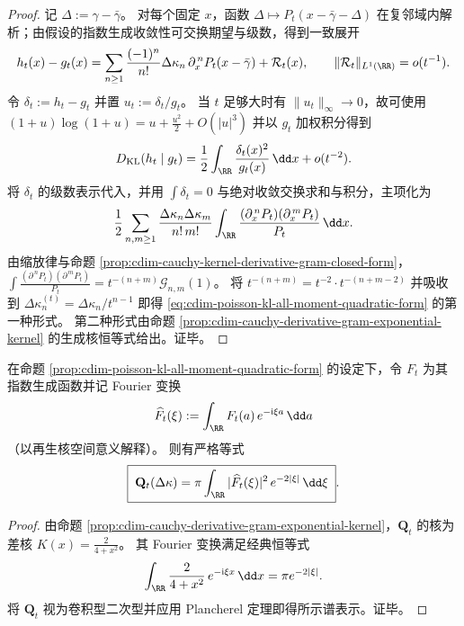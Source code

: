 \begin{proof}
记 \(\Delta:=\gamma-\bar\gamma\)。
对每个固定 \(x\)，函数 \(\Delta\mapsto P_t(x-\bar\gamma-\Delta)\) 在复邻域内解析；由假设的指数生成收敛性可交换期望与级数，得到一致展开
\[
h_t(x)-g_t(x)
=\sum_{n\ge 1}\frac{(-1)^n}{n!}\Delta\kappa_n\,\partial_x^{\,n}P_t(x-\bar\gamma)+\mathcal R_t(x),
\qquad
\|\mathcal R_t\|_{L^1(\RR)}=o(t^{-1}).
\]
令 \(\delta_t:=h_t-g_t\) 并置 \(u_t:=\delta_t/g_t\)。
当 \(t\) 足够大时有 \(\|u_t\|_\infty\to 0\)，故可使用
\(
(1+u)\log(1+u)=u+\frac{u^2}{2}+O(|u|^3)
\)
并以 \(g_t\) 加权积分得到
\[
D_{\mathrm{KL}}(h_t\mid g_t)
=\frac12\int_{\RR}\frac{\delta_t(x)^2}{g_t(x)}\,\dd x+o(t^{-2}).
\]
将 \(\delta_t\) 的级数表示代入，并用 \(\int \delta_t=0\) 与绝对收敛交换求和与积分，主项化为
\[
\frac12\sum_{n,m\ge 1}\frac{\Delta\kappa_n\Delta\kappa_m}{n!\,m!}
\int_{\RR}\frac{(\partial_x^{\,n}P_t)(\partial_x^{\,m}P_t)}{P_t}\,\dd x.
\]
由缩放律与命题 \ref{prop:cdim-cauchy-kernel-derivative-gram-closed-form}，
\(
\int \frac{(\partial^{\,n}P_t)(\partial^{\,m}P_t)}{P_t}
=t^{-(n+m)}\mathcal G_{n,m}(1)
\)。
将 \(t^{-(n+m)}=t^{-2}\cdot t^{-(n+m-2)}\) 并吸收到 \(\Delta\kappa^{(t)}_n=\Delta\kappa_n/t^{n-1}\) 即得 \eqref{eq:cdim-poisson-kl-all-moment-quadratic-form} 的第一种形式。
第二种形式由命题 \ref{prop:cdim-cauchy-derivative-gram-exponential-kernel} 的生成核恒等式给出。证毕。
\end{proof}

\begin{proposition}\label{prop:cdim-poisson-kl-quadratic-form-spectral}
在命题 \ref{prop:cdim-poisson-kl-all-moment-quadratic-form} 的设定下，令 \(F_t\) 为其指数生成函数并记 Fourier 变换
\[
\widehat F_t(\xi):=\int_{\RR}F_t(a)\,e^{-\mathrm{i}\xi a}\,\dd a
\]
（以再生核空间意义解释）。
则有严格等式
\[
\boxed{\;
\mathbf Q_t(\Delta\kappa)=\pi\int_{\RR}|\widehat F_t(\xi)|^2\,e^{-2|\xi|}\,\dd\xi\; }.
\]
\end{proposition}
\begin{proof}
由命题 \ref{prop:cdim-cauchy-derivative-gram-exponential-kernel}，\(\mathbf Q_t\) 的核为差核 \(K(x)=\frac{2}{4+x^2}\)。
其 Fourier 变换满足经典恒等式
\[
\int_{\RR}\frac{2}{4+x^2}\,e^{-\mathrm{i}\xi x}\,\dd x=\pi e^{-2|\xi|}.
\]
将 \(\mathbf Q_t\) 视为卷积型二次型并应用 Plancherel 定理即得所示谱表示。证毕。
\end{proof}

